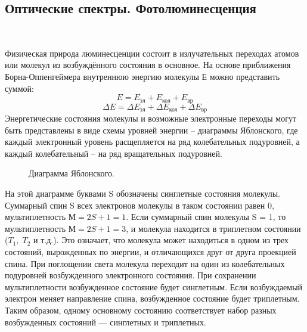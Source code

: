 \documentclass{article}
\begin{document}
\subsection{Оптические спектры. Фотолюминесценция}\
\par Физическая природа люминесценции состоит в
излучательных переходах атомов или молекул из возбуждённого состояния в основное.
На основе приближения Борна-Оппенгеймера внутреннюю энергию молекулы Е
можно представить суммой:
\begin{equation}
    E = E_{\text{эл}} + E_{\text{кол}} + E_{\text{вр}}
\end{equation}
\begin{equation}
    \Delta E = \Delta E_{\text{эл}} + \Delta E_{\text{кол}} + \Delta E_{\text{вр}}
\end{equation}
Энергетические состояния молекулы и возможные электронные переходы могут быть
представлены в виде схемы уровней энергии – диаграммы Яблонского, где каждый
электронный уровень расщепляется на ряд
колебательных подуровней, а каждый
колебательный – на ряд вращательных подуровней.
\begin{figure}[h!]
        \caption{Диаграмма Яблонского.}
    \end{figure}

На этой диаграмме буквами S обозначены синглетные состояния молекулы. Суммарный спин S всех электронов молекулы в таком состоянии равен 0, мультиплетность $М = 2S+1 = 1$. Если суммарный спин молекулы S = 1, то мультиплетность $М = 2S+1 = 3$, и
молекула находится в триплетном состоянии ($T_1,\; T_2$ и т.д.). Это означает, что молекула может
находиться в одном из трех состояний, вырожденных по энергии, и отличающихся друг от друга проекцией спина.
При поглощении света молекула
переходит на один из колебательных подуровней возбужденного электронного состояния. При сохранении мультиплетности возбужденное состояние будет синглетным.
Если возбуждаемый электрон меняет направление спина, возбужденное состояние будет триплетным. Таким образом, одному основному состоянию соответствует набор разных возбужденных состояний — синглетных и триплетных.
\end{document}
